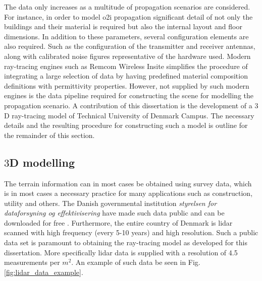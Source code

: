 The data only increases as a multitude of propagation scenarios are considered. For instance, in order to model \gls{o2i} propagation significant detail of not only the buildings and their material is required but also the internal layout and floor dimensions. In addition to these parameters, several configuration elements are also required. Such as the configuration of the transmitter and receiver antennas, along with calibrated noise figures representative of the hardware used. Modern ray-tracing engines such as Remcom Wireless Insite \cite{remcom} simplifies the procedure of integrating a large selection of data by having predefined material composition definitions with permittivity properties. However, not supplied by such modern engines is the data pipeline required for constructing the scene for modelling the propagation scenario. A contribution of this dissertation is the development of a $3$D ray-tracing model of Technical University of Denmark Campus. The necessary details and the resulting procedure for constructing such a model is outline for the remainder of this section.

\subsection{$3$D modelling}

The terrain information can in most cases be obtained using survey data, which is in most cases a necessary practice for many applications such as construction, utility and others. The Danish governmental institution \emph{styrelsen for dataforsyning og effektivisering} have made such data public and can be downloaded for free \cite{kortforsyningen}. Furthermore, the entire country of Denmark is \gls{lidar} scanned with high frequency (every 5-10 years) and high resolution. Such a public data set is paramount to obtaining the ray-tracing model as developed for this dissertation. More specifically \gls{lidar} data is supplied with a resolution of 4.5 measurements per $m^2$. An example of such data be seen in Fig. \ref{fig:lidar_data_example}. 

